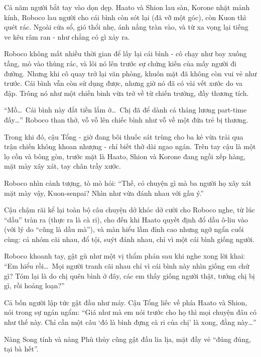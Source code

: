 \documentclass[../main.tex]{subfiles}
\begin{document}
Cả năm người bắt tay vào dọn dẹp. Haato và Shion lau sàn, Korone nhặt mảnh kính, Roboco lau người cho cái bình còn sót lại (đã vỡ một góc), còn Kuon thì quét rác. Ngoài cửa sổ, gió thổi nhẹ, ánh nắng tràn vào, và từ xa vọng lại tiếng ve kêu râm ran - như chẳng có gì xảy ra.
\omk

Roboco không mất nhiều thời gian để lấy lại cái bình - cô chạy như bay xuống tầng, mò vào thùng rác, và lôi nó lên trước sự chứng kiến của mấy người đi đường. Nhưng khi cô quay trở lại văn phòng, khuôn mặt đã không còn vui vẻ như trước. Cái bình vẫn còn sử dụng được, nhưng giờ nó đã có vài vết xước do va đập. Trông nó như một chiến binh vừa trở về từ chiến trường, đầy thương tích.

``Mồ\dots\ Cái bình này đắt tiền lắm ớ\dots\ Chị đã để dành cả tháng lương part-time đấy\dots''  Roboco than thở, vỗ vỗ lên chiếc bình như vỗ về một đứa trẻ bị thương.

Trong khi đó, cậu Tổng - giờ đang bôi thuốc sát trùng cho ba kẻ vừa trải qua trận chiến không khoan nhượng - chỉ biết thở dài ngao ngán. Trên tay cậu là một lọ cồn và bông gòn, trước mặt là Haato, Shion và Korone đang ngồi xếp hàng, mặt mày xây xát, tay chân trầy xước.

Roboco nhìn cảnh tượng, tò mò hỏi: ``Thế, có chuyện gì mà ba người họ xây xát mặt mày vậy, Kuon-senpai? Nhìn như vừa đánh nhau với gấu ý.''

Cậu chậm rãi kể lại toàn bộ câu chuyện dở khóc dở cười cho Roboco nghe, từ lúc ``dầu'' tràn ra (thực ra là cà ri), cho đến khi Haato quyết định đổ dầu ô-liu vào (với lý do ``cũng là dầu mà''), và màn hiểu lầm đỉnh cao nhưng ngớ ngẩn cuối cùng: cả nhóm cãi nhau, đổ tội, suýt đánh nhau, chỉ vì một cái bình giống người.

Roboco khoanh tay, gật gù như một vị thẩm phán sau khi nghe xong lời khai: ``Em hiểu rồi\dots\ Mọi người tranh cãi nhau chỉ vì cái bình này nhìn giống em chứ gì? Tóm lại là do chị quên bình ở đây, các em thấy giống người thật, tưởng chị bị gì, rồi hoảng loạn?''

Cả bốn người lập tức gật đầu như máy. Cậu Tổng liếc về phía Haato và Shion, nói trong sự ngán ngẩm: ``Giá như mà em nói trước cho họ thì mọi chuyện đâu có như thế này. Chỉ cần một câu `đó là bình đựng cà ri của chị' là xong, đằng này\dots''

Nàng Song tính và nàng Phù thủy cũng gật đầu lia lịa, mặt đầy vẻ ``đúng đúng, tại bà hết''.
\end{document}
